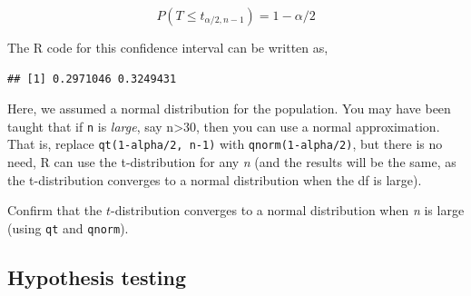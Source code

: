 \documentclass[]{book}
\newenvironment{Shaded}{\begin{snugshade}}{\end{snugshade}}
\newcommand{\CommentTok}[1]{\textcolor[rgb]{0.56,0.35,0.01}{\textit{#1}}}
\newcommand{\DecValTok}[1]{\textcolor[rgb]{0.00,0.00,0.81}{#1}}
\newcommand{\FloatTok}[1]{\textcolor[rgb]{0.00,0.00,0.81}{#1}}
\newcommand{\KeywordTok}[1]{\textcolor[rgb]{0.13,0.29,0.53}{\textbf{#1}}}
\newcommand{\NormalTok}[1]{#1}
\newcommand{\OperatorTok}[1]{\textcolor[rgb]{0.81,0.36,0.00}{\textbf{#1}}}
\newcommand{\StringTok}[1]{\textcolor[rgb]{0.31,0.60,0.02}{#1}}
\let\BeginKnitrBlock\begin \let\EndKnitrBlock\end
\begin{document}
\[P(T \leq t_{\alpha/2, n-1}) = 1-\alpha/2 \]

The R code for this confidence interval can be written as,

\begin{Shaded}
\end{Shaded}

\begin{verbatim}
## [1] 0.2971046 0.3249431
\end{verbatim}

Here, we assumed a normal distribution for the population. You may have been taught that if \texttt{n} is \emph{large}, say n\textgreater{}30, then you can use a normal approximation. That is, replace \texttt{qt(1-alpha/2,\ n-1)} with \texttt{qnorm(1-alpha/2)}, but there is no need, R can use the t-distribution for any \emph{n} (and the results will be the same, as the t-distribution converges to a normal distribution when the df is large).

\BeginKnitrBlock{rmdtry}
Confirm that the \(t\)-distribution converges to a normal distribution when \emph{n} is large (using \texttt{qt} and \texttt{qnorm}).
\EndKnitrBlock{rmdtry}

\hypertarget{hypothesis-testing}{%
\subsection{Hypothesis testing}\label{hypothesis-testing}}
\end{document}

